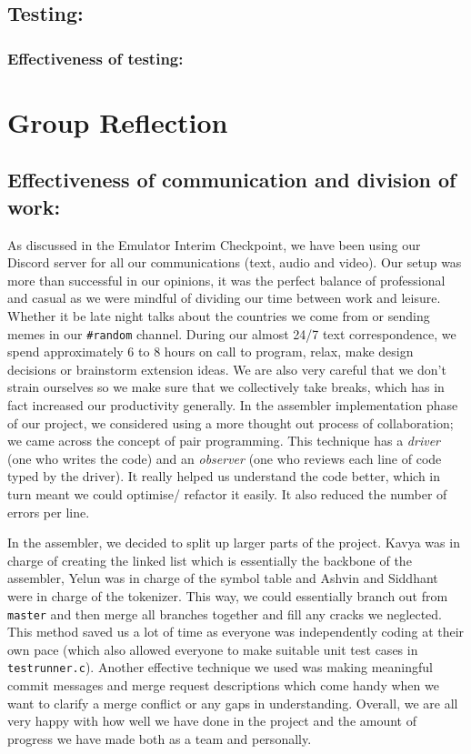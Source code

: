\documentclass[a4paper]{article}
\begin{document}
\subsection{Testing:}
\lipsum[1-1]
\subsubsection{Effectiveness of testing:}
\lipsum[1-1]

\section{Group Reflection}
\subsection{Effectiveness of communication and division of work:}

As discussed in the Emulator Interim Checkpoint, we have been using our Discord server for all our communications (text, audio and video). Our setup was more than successful in our opinions, it was the perfect balance of professional and casual as we were mindful of dividing our time between work and leisure. Whether it be late night talks about the countries we come from or sending memes in our \verb|#random| channel. During our almost 24/7 text correspondence, we spend approximately 6 to 8 hours on call to program, relax, make design decisions or brainstorm extension ideas. We are also very careful that we don't strain ourselves so we make sure that we collectively take breaks, which has in fact increased our productivity generally. In the assembler implementation phase of our project, we considered using a more thought out process of collaboration; we came across the concept of pair programming. This technique has a \textit{driver} (one who writes the code) and an \textit{observer} (one who reviews each line of code typed by the driver). It really helped us understand the code better, which in turn meant we could optimise/ refactor it easily. It also reduced the number of errors per line.

In the assembler, we decided to split up larger parts of the project. Kavya was in charge of creating the linked list which is essentially the backbone of the assembler, Yelun was in charge of the symbol table and Ashvin and Siddhant were in charge of the tokenizer. This way, we could essentially branch out from \verb|master| and then merge all branches together and fill any cracks we neglected. This method saved us a lot of time as everyone was independently coding at their own pace (which also allowed everyone to make suitable unit test cases in \verb|testrunner.c|). Another effective technique we used was making meaningful commit messages and merge request descriptions which come handy when we want to clarify a merge conflict or any gaps in understanding. Overall, we are all very happy with how well we have done in the project and the amount of progress we have made both as a team and personally.
\end{document}
